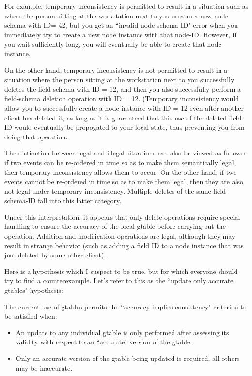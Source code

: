 For example, temporary inconsistency is permitted to result in a 
situation such as where the person sitting at the workstation next to 
you creates a new node schema with ID= 42, but you get an ``invalid 
node schema ID" error when you immediately try to create a new 
node instance with that node-ID.  However, if you wait sufficiently 
long, you will eventually be able to create that node instance. 

On the other hand, temporary inconsistency is not permitted to result in a
situation where the person sitting at the workstation next to you
successfully deletes the field-schema with ID = 12, and then you also
successfully perform a field-schema deletion operation with ID = 12.
(Temporary inconsistency would allow you to successfully create a node
instance with ID = 12 even after another client has deleted it, as long as
it is guaranteed that this use of the deleted field-ID would eventually be
propogated to your local state, thus preventing you from doing that
operation.

The distinction between legal and illegal situations can also be viewed as
follows: if two events can be re-ordered in time so as to make them
semantically legal, then temporary inconsistency allows them to occur. On
the other hand, if two events cannot be re-ordered in time so as to make
them legal, then they are also not legal under temporary inconsistency.
Multiple deletes of the same field-schema-ID fall into this latter
category.

Under this interpretation, it appears that only delete operations 
require special handling to ensure the accuracy of the local gtable 
before carrying out the operation.  Addition and modification 
operations are legal, although they may result in strange behavior 
(such as adding a field ID to a node instance that was just deleted by 
some other client).  

Here is a hypothesis which I suspect to be true, but for which
everyone should try to find a counterexample. Let's refer to this as
the ``update only accurate gtables" hypothesis:

The current use of gtables permits the ``accuracy implies consistency"
criterion to be satisfied when:
\begin{itemize}
  \item An update to any individual gtable is only performed after 
      assessing its validity with respect to an ``accurate" version
      of the gtable.
  \item Only an accurate version of the gtable being updated is required,
      all others may be inaccurate. 
\end{itemize}

